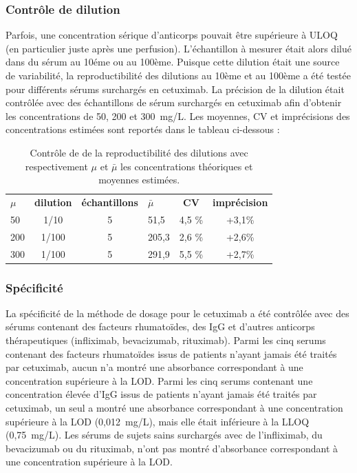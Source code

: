 \subsubsection{Contrôle de dilution}
Parfois, une concentration sérique d'anticorps pouvait être supérieure à ULOQ (en particulier juste après une perfusion). L'échantillon à mesurer était alors dilué dans du sérum au 10éme ou au 100ème. Puisque cette dilution était une source de variabilité, la reproductibilité des dilutions au 10ème et au 100ème a été testée pour différents sérums surchargés en cetuximab. La précision de la dilution était contrôlée avec des échantillons de sérum surchargés en cetuximab afin d'obtenir les concentrations de 50, 200 et 300~mg/L. Les moyennes, CV et imprécisions des concentrations estimées sont reportés dans le tableau ci-dessous :

\begin{table}[!ht]
  \centering
  \caption{Contrôle de de la reproductibilité des dilutions avec respectivement $\mu$ et $\bar{\mu}$ les concentrations théoriques et moyennes estimées.}
    \begin{tabular}{lcclcc}
    &&&&&\\
      \hline
      \textbf{$\mu$} & \textbf{dilution} & \textbf{échantillons} & \textbf{$\bar{\mu}$} & \textbf{CV} & \textbf{imprécision} \\
      \hline
      \hline
      50 & 1/10 & 5 & 51,5 & 4,5 \% & +3,1\% \\
      200 & 1/100 & 5 & 205,3 & 2,6 \% & +2,6\% \\
      300 & 1/100 & 5 & 291,9 & 5,5 \% & +2,7\% \\
      \hline
    \end{tabular}
  \label{tab:3}
\end{table}

\subsubsection{Spécificité}
La spécificité de la méthode de dosage pour le cetuximab a été contrôlée avec des sérums contenant des facteurs rhumatoïdes, des IgG et d'autres anticorps thérapeutiques (infliximab, bevacizumab, rituximab). Parmi les cinq serums contenant des facteurs rhumatoïdes issus de patients n'ayant jamais été traités par cetuximab, aucun n'a montré une absorbance correspondant à une concentration supérieure à la LOD. Parmi les cinq serums contenant une concentration élevée d'IgG issus de patients n'ayant jamais été traités par cetuximab, un seul a montré une absorbance correspondant à une concentration supérieure à la LOD (0,012~mg/L), mais elle était inférieure à la LLOQ (0,75~mg/L). Les sérums de sujets sains surchargés avec de l'infliximab, du bevacizumab ou du rituximab, n'ont pas montré d'absorbance correspondant à une concentration supérieure à la LOD.
